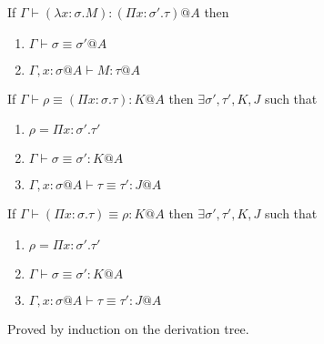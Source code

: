 \documentclass[9pt, a4paper]{extarticle}
\theoremstyle{break}
\newcommand{\G}{\Gamma}
\newcommand{\V}{\vdash}
\newcommand{\E}{\equiv}
\begin{document}
\begin{thm}
    If $\G \V (\lambda x:\sigma.M) : (\Pi x:\sigma'.\tau)@A$ then
    \begin{enumerate}
        \item $\G \V \sigma \E \sigma'@A$
        \item $\G ,x:\sigma@A\V M:\tau@A$
    \end{enumerate}
    \item If $\G \V \rho \E (\Pi x:\sigma.\tau) : K @A$ then $\exists \sigma', \tau', K, J$ such that
    \begin{enumerate}
        \item $\rho = \Pi x:\sigma'.\tau'$
        \item $\G \V \sigma \E \sigma' : K @A$
        \item $\G, x:\sigma@A\V \tau \E \tau' : J @A$
    \end{enumerate}
    \item If $\G \V (\Pi x:\sigma.\tau) \E \rho : K @A$ then $\exists \sigma', \tau', K, J$ such that
    \begin{enumerate}
        \item $\rho = \Pi x:\sigma'.\tau'$
        \item $\G \V \sigma \E \sigma' : K @A$
        \item $\G, x:\sigma@A\V \tau \E \tau' : J @A$
    \end{enumerate}
\end{thm}

Proved by induction on the derivation tree.
\end{document}
